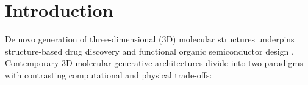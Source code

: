 \documentclass[11pt,a4paper]{article}
\begin{document}
\begin{abstract}
verified by live \texttt{GPU4PySCF PBE0/def2-TZVP} quantum chemistry ($0.56\,\text{GPU-h}$), single-output \textbf{Uni-3DAR-Mol} lifts drug-scale valid-connected yield $6.78\times$ ($12.7\% \to 86.2\%$, $99.83\%$ explicit atom stability), runs $7.3\times$ faster ($1\to 1\to 1$) or $1.65\times$ faster with $2.0\times$ higher valid-connected yield ($16\to 4\to 1$) than $100$-step \texttt{FlowMol} at $N=100$, surpasses $6$-model $156\,\text{GPU-h}$ \texttt{PropMolFlow} on \texttt{QM9} $\varepsilon_{\text{HOMO}}$ ($-12.7\%$) and $\mu$ ($-21.0\%$) at $362\times$ lower training compute, and beats $52\,\text{GPU-h}$ single-shot \texttt{PropMolFlow} on \texttt{OE62} in both blind clean hit rate ($34.4\%$ vs.\ $30.8\%$) and live \texttt{PBE0/def2-TZVP} quantum hit rate ($33.3\%$ vs.\ $16.7\%$, $2.0\times$) at $92.8\times$ lower training compute.
\end{abstract}

\section{Introduction}
\label{sec:intro}

De novo generation of three-dimensional (3D) molecular structures underpins structure-based drug discovery \citep{axelrod2022geom,dunn2024flowmol,irwin2025semlaflow} and functional organic semiconductor design \citep{stuke2020oe62,zeng2026propmolflow}. Contemporary 3D molecular generative architectures divide into two paradigms with contrasting computational and physical trade-offs:
\end{document}
